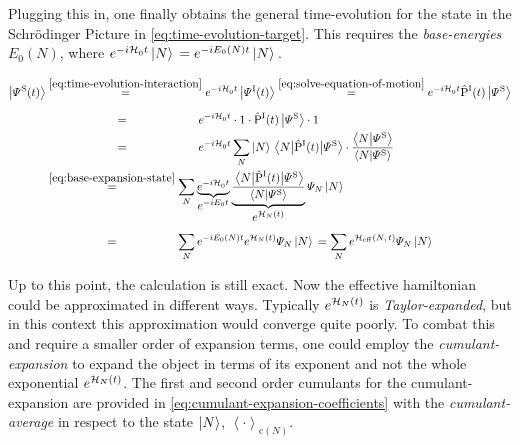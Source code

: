 Plugging this in, one finally obtains the general time-evolution for the state in the Schrödinger Picture in \autoref{eq:time-evolution-target}.
This requires the \emph{base-energies} $E_0(N)$, where $e^{-i \mathcal{H}_0^{}{} t}\ket{N}{} = e^{-i E_0(N) t}\ket{N}{}$.

\begin{equation}
    \label{eq:time-evolution-target}
    \begin{split}
        \ketpsiof[\schroedingerPicture]{t} &\stackrel{\ref{eq:time-evolution-interaction}}{=} e^{-i \HzeroHamiltonian{} t} \ketpsiof[\interactionPicture]{t} 
        \stackrel{\ref{eq:solve-equation-of-motion}}{=}
        e^{-i \HzeroHamiltonian{} t} \timeEvolutionOperator[\interactionPicture] \ketpsi[\schroedingerPicture]{} \\
        &\stackrel{\phantom{\ref{eq:solve-equation-of-motion}}}{=}
        e^{-i \HzeroHamiltonian{} t} \cdot 1 \cdot  \timeEvolutionOperator[\interactionPicture] \ketpsi[\schroedingerPicture]{}\cdot 1\\
        &\stackrel{\phantom{\ref{eq:solve-equation-of-motion}}}{=}
        e^{-i \HzeroHamiltonian{} t} \lsum[N] \ketN{} \bracketHelper{N}{\timeEvolutionOperator[\interactionPicture]}{\picturePsi[\schroedingerPicture]{}} \cdot \frac{\braketHelper{N}{\picturePsi[\schroedingerPicture]{}}}{\braketHelper{N}{\picturePsi[\schroedingerPicture]{}}}\\
        &\stackrel{\ref{eq:base-expansion-state}}{=}
        \lsum[N] \underbrace{e^{-i \HzeroHamiltonian{} t}}_{\text{\normalsize{$e^{-i E_0 t}$}}}  \underbrace{\frac{\bracketHelper{N}{\timeEvolutionOperator[\interactionPicture]}{\picturePsi[\schroedingerPicture]{}}}{\braketHelper{N}{\picturePsi[\schroedingerPicture]{}}}}_{\text{\normalsize{$e^{\HNOft}$}}}  \psiN \ketN{}\\
        &\stackrel{\phantom{\ref{eq:base-expansion-state}}}{=}
        \lsum[N] e^{-i E_0(N) t}  e^{\HNOft} \psiN \ketN{} = 
        \lsum[N] e^{\HeffOft} \psiN \ketN{}
    \end{split}
\end{equation}

Up to this point, the calculation is still exact. Now the effective hamiltonian \HNOft could be approximated in different ways. Typically $e^{\mathcal{H}_{N}(t)}$ is \emph{Taylor-expanded}, but in this context this approximation would converge quite poorly. 
To combat this and require a smaller order of expansion terms, one could employ the \emph{cumulant-expansion} \cite{cumulantExpansionOriginalDerivation} to expand the object in terms of its exponent \HNOft and not the whole exponential $e^{\mathcal{H}_{N}(t)}$.
The first and second order cumulants for the cumulant-expansion are provided in \autoref{eq:cumulant-expansion-coefficients} \cite{variationalClassicalNetworksPaper} with the \emph{cumulant-average} in respect to the state $\ket{N}$, $\left\langle\cdot\right\rangle_{\text{c}(N)}$.


